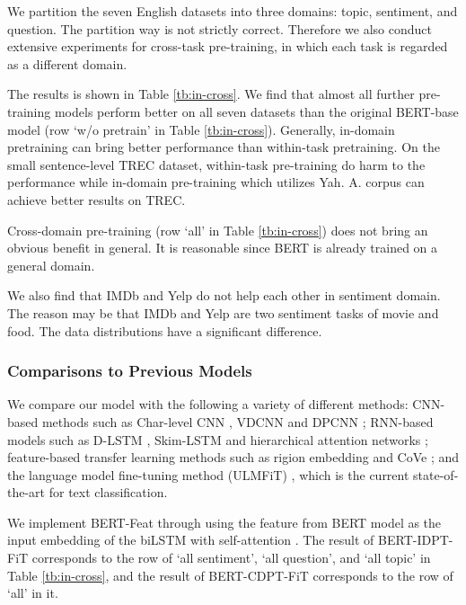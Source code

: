 \documentclass[11pt,a4paper]{article}
\theoremstyle{definition}
\begin{document}
\begin{CJK*}{UTF8}{gbsn}
We partition the seven English datasets into three domains: topic, sentiment, and question. The partition way is not strictly correct. Therefore we also conduct extensive experiments for cross-task pre-training, in which each task is regarded as a different domain.


The results is shown in Table \ref{tb:in-cross}. We find that almost all further pre-training models perform better on all seven datasets than the original BERT-base model (row `w/o pretrain' in Table \ref{tb:in-cross}). Generally, in-domain pretraining can bring better performance than within-task pretraining. On the small sentence-level TREC dataset, within-task pre-training do harm to the performance while in-domain pre-training which utilizes Yah. A. corpus can achieve better results on TREC.

Cross-domain pre-training (row `all' in Table \ref{tb:in-cross}) does not bring an obvious benefit in general. It is reasonable since BERT is already trained on a general domain.

We also find that IMDb and Yelp do not help each other in sentiment domain. The reason may be that IMDb and Yelp are two sentiment tasks of movie and food. The data distributions have a significant difference.




\subsubsection{Comparisons to Previous Models}
    We compare our model with the following a variety of different methods: CNN-based methods such as Char-level CNN \cite{zhang2015character}, VDCNN \cite{conneau2016very} and DPCNN \cite{johnson2017deep}; RNN-based models such as D-LSTM \cite{yogatama2017generative}, Skim-LSTM \cite{seo2017neural} and hierarchical attention networks \cite{yang2016hierarchical}; feature-based transfer learning methods such as rigion embedding \cite{qiao2018anew} and CoVe \cite{mccann2017learned}; and the language model fine-tuning method (ULMFiT) \cite{howard2018universal}, which is the current state-of-the-art for text classification.

	We implement BERT-Feat through using the feature from BERT model as the input embedding of the biLSTM with self-attention \cite{lin2017structured}. The result of BERT-IDPT-FiT corresponds to the row of `all sentiment', `all question', and `all topic' in Table \ref{tb:in-cross}, and the result of BERT-CDPT-FiT corresponds to the row of `all' in it.
	

\end{CJK*}
\end{document}
